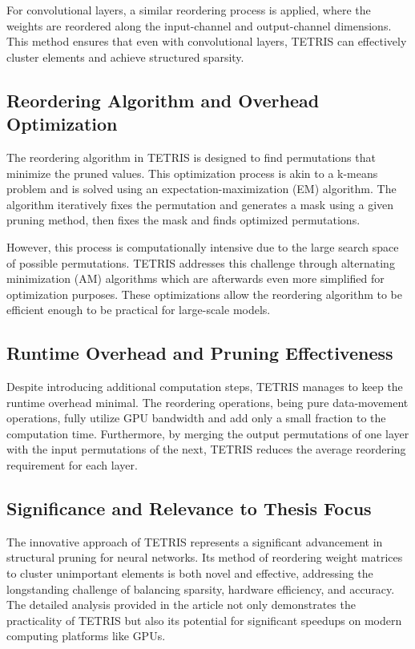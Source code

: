 For convolutional layers, a similar reordering process is applied, where the weights are reordered along the input-channel and output-channel dimensions. This method ensures that even with convolutional layers, TETRIS can effectively cluster elements and achieve structured sparsity.

\subsection{Reordering Algorithm and Overhead Optimization}

The reordering algorithm in TETRIS is designed to find permutations that minimize the pruned values. This optimization process is akin to a k-means problem and is solved using an expectation-maximization (EM) algorithm. The algorithm iteratively fixes the permutation and generates a mask using a given pruning method, then fixes the mask and finds optimized permutations.

However, this process is computationally intensive due to the large search space of possible permutations. TETRIS addresses this challenge through alternating minimization (AM) algorithms which are afterwards even more simplified for optimization purposes. These optimizations allow the reordering algorithm to be efficient enough to be practical for large-scale models.

\subsection{Runtime Overhead and Pruning Effectiveness}

Despite introducing additional computation steps, TETRIS manages to keep the runtime overhead minimal. The reordering operations, being pure data-movement operations, fully utilize GPU bandwidth and add only a small fraction to the computation time. Furthermore, by merging the output permutations of one layer with the input permutations of the next, TETRIS reduces the average reordering requirement for each layer.

\subsection{Significance and Relevance to Thesis Focus}

The innovative approach of TETRIS represents a significant advancement in structural pruning for neural networks. Its method of reordering weight matrices to cluster unimportant elements is both novel and effective, addressing the longstanding challenge of balancing sparsity, hardware efficiency, and accuracy. The detailed analysis provided in the article not only demonstrates the practicality of TETRIS but also its potential for significant speedups on modern computing platforms like GPUs.

